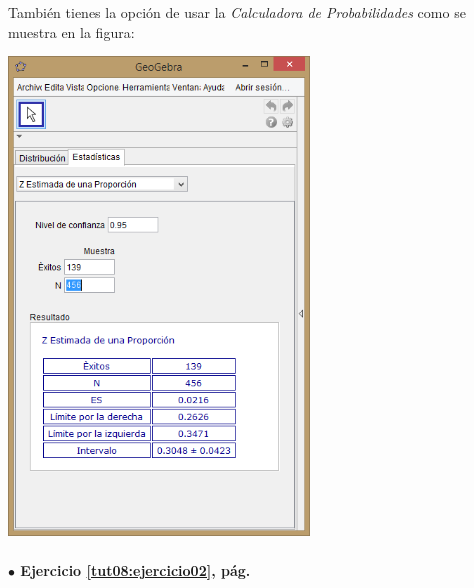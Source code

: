 \documentclass[10pt,a4paper]{article}\usepackage[]{graphicx}\usepackage[]{color}
\begin{document}
\begin{enumerate}
  También tienes la opción de usar la {\em Calculadora de Probabilidades} como se muestra en la figura:
    \begin{center}
    \includegraphics[width=8cm]{../fig/Tut08-08.png}
    \end{center}

\end{enumerate}

\paragraph{\bf $\bullet$ Ejercicio \ref{tut08:ejercicio02}, pág. \pageref{tut08:ejercicio02}}
\label{tut08:ejercicio02:sol}\quad\\
\end{document}
